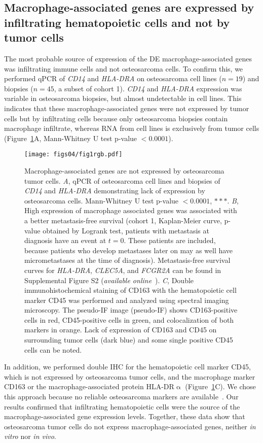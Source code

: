 \subsection{Macrophage\hyp{}associated genes are expressed by infiltrating he\-ma\-to\-poi\-e\-tic cells and not by tumor cells}
The most probable source of expression of the DE macrophage\hyp{}associated genes was infiltrating immune cells and
not osteosarcoma cells. To confirm this, we performed qPCR
of {\it CD14} and {\it HLA-DRA} on osteosarcoma cell lines ($n=19$) and biopsies ($n=45$, a subset of cohort 1). {\it CD14} and
{\it HLA-DRA} expression was variable in osteosarcoma biopsies,
but almost undetectable in cell lines. This indicates that
these macrophage\hyp{}associated genes were not expressed by
tumor cells but by infiltrating cells because only osteosarcoma
biopsies contain macrophage infiltrate, whereas RNA
from cell lines is exclusively from tumor cells (Figure~\ref{fig4.1}A,
Mann\hyp{}Whitney U test p-value $<0.0001$).
%
\begin{figure}[htbp]
	\centering
	\texttt{[image: figs04/fig1rgb.pdf]}	%
	\caption{Macrophage\hyp{}associated genes are not expressed by osteosarcoma tumor cells. {\it A}, qPCR of osteosarcoma cell lines and biopsies of {\it CD14} and {\it HLA-DRA} demonstrating lack of expression by osteosarcoma cells. Mann\hyp{}Whitney U test p-value $<0.0001$, $\ast\ast\ast$. {\it B}, High expression of macrophage associated genes was associated with a better metastasis\hyp{}free survival (cohort 1, Kaplan\hyp{}Meier curve, p-value obtained by Logrank test, patients with metastasis at diagnosis have an event at $t=0$. These patients are included, because patients who develop metastases later on may as well have micrometastases at the time of diagnosis). Metastasis\hyp{}free survival curves for {\it HLA-DRA}, {\it CLEC5A}, and {\it FCGR2A} can be found in Supplemental Figure S2 ({\it available online}~\cite{ch4additional}). {\it C}, Double immunohistochemical staining of CD163 with the hematopoietic cell marker CD45 was performed and analyzed using spectral imaging microscopy. The pseudo\hyp{}IF image (pseudo\hyp{}IF) shows CD163\hyp{}positive cells in red, CD45\hyp{}positive cells in green, and colocalization of both markers in orange. Lack of expression of CD163 and CD45 on surrounding tumor cells (dark blue) and some single positive CD45 cells can be noted.}
	\label{fig4.1}
\end{figure}
%
In addition, we performed
double IHC for the hematopoietic cell marker
CD45, which is not expressed by osteosarcoma tumor cells,
and the macrophage marker CD163 or the macrophage\hyp{}associated
protein HLA-DR$\upalpha$ (Figure~\ref{fig4.1}C). We chose this
approach because no reliable osteosarcoma markers are
available~\cite{raymond2002conventional}. Our results confirmed that infiltrating hematopoietic
cells were the source of the macrophage\hyp{}associated
gene expression levels. Together, these data show that
osteosarcoma tumor cells do not express macrophage\hyp{}associated
genes, neither {\it in vitro} nor {\it in vivo}.

